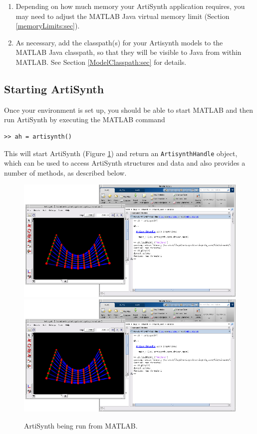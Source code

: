 \documentclass{article}
\begin{document}
\begin{enumerate}
\item Depending on how much memory your ArtiSynth application requires,
you may need to adjust the MATLAB Java virtual memory limit (Section
\ref{memoryLimits:sec}).

\item As necessary, add the classpath(s) for your Artisynth models to
the MATLAB Java classpath, so that they will be visible to Java from
within MATLAB. See Section \ref{ModelClasspath:sec} for details.

\end{enumerate}

\subsection{Starting ArtiSynth} 

Once your environment is set up, you should be able to start MATLAB
and then run ArtiSynth by executing the MATLAB command
%
\begin{lstlisting}[]
  >> ah = artisynth()
\end{lstlisting}
%
This will start ArtiSynth (Figure \ref{artisynthMatlab:fig}) and
return an {\tt ArtisynthHandle} object, which can be used to access
ArtiSynth structures and data and also provides a number of methods,
as described below.

\begin{figure}[t]
\begin{center}
\iflatexml
 \includegraphics[]{images/artisynthMatlab}
\else
 \includegraphics[width=6in]{images/artisynthMatlab}
\fi
\end{center}
\caption{ArtiSynth being run from MATLAB.}
\label{artisynthMatlab:fig}
\end{figure}
\end{document}
